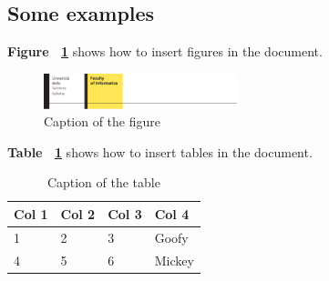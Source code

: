 \subsection {Some examples}

\textbf{Figure ~\ref{fig:USILogo}} shows how to insert figures in the document.

\begin{figure} [h]
\centering
\includegraphics[width=0.5\textwidth]{Other/logo-info.pdf}
\caption{Caption of the figure}
\label{fig:USILogo}
\end{figure}

\noindent\textbf{Table ~\ref{tab:numbers}} shows how to insert tables in the document.

\begin{table}[h]
\centering
{} {
\begin{normalsize}\begin{tabular}{l|lll}
\textbf{Col 1} & \textbf{Col 2} & \textbf{Col 3} & \textbf{Col 4}\\
\hline
1 & 2 & 3 & Goofy\\
4 & 5 & 6 & Mickey
\end{tabular}
\end{normalsize}
}
\caption{Caption of the table}
\label{tab:numbers}
\end{table}
